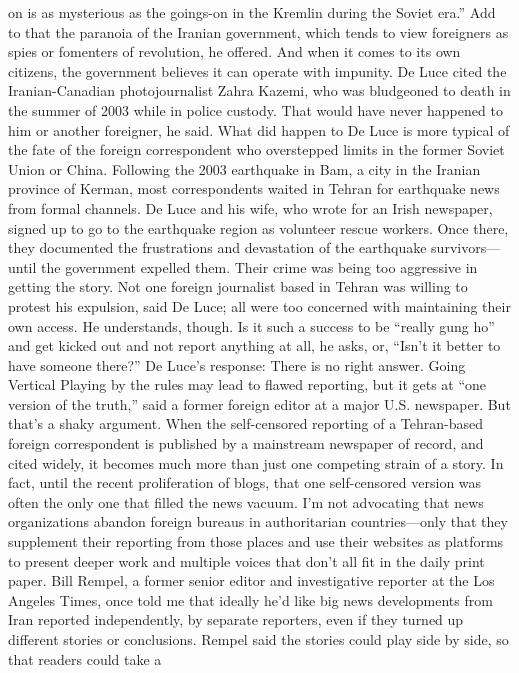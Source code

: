 on is as mysterious as the goings-on in the Kremlin during the Soviet era.'' Add to that
the paranoia of the Iranian government, which tends to view foreigners as spies or
fomenters of revolution, he offered. And when it comes to its own citizens, the
government believes it can operate with impunity. De Luce cited the Iranian-Canadian
photojournalist Zahra Kazemi, who was bludgeoned to death in the summer of 2003
while in police custody. That would have never happened to him or another foreigner, he
said.
What did happen to De Luce is more typical of the fate of the foreign correspondent who
overstepped limits in the former Soviet Union or China. Following the 2003 earthquake
in Bam, a city in the Iranian province of Kerman, most correspondents waited in Tehran
for earthquake news from formal channels. De Luce and his wife, who wrote for an Irish
newspaper, signed up to go to the earthquake region as volunteer rescue workers. Once
there, they documented the frustrations and devastation of the earthquake survivors—
until the government expelled them. Their crime was being too aggressive in getting the
story.
Not one foreign journalist based in Tehran was willing to protest his expulsion, said De
Luce; all were too concerned with maintaining their own access. He understands, though.
Is it such a success to be ``really gung ho'' and get kicked out and not report anything at
all, he asks, or, ``Isn’t it better to have someone there?'' De Luce’s response: There is no
right answer.
Going Vertical
Playing by the rules may lead to flawed reporting, but it gets at ``one version of the truth,''
said a former foreign editor at a major U.S. newspaper. But that’s a shaky argument.
When the self-censored reporting of a Tehran-based foreign correspondent is published
by a mainstream newspaper of record, and cited widely, it becomes much more than just
one competing strain of a story. In fact, until the recent proliferation of blogs, that one
self-censored version was often the only one that filled the news vacuum.
I’m not advocating that news organizations abandon foreign bureaus in authoritarian
countries—only that they supplement their reporting from those places and use their
websites as platforms to present deeper work and multiple voices that don’t all fit in the
daily print paper.
Bill Rempel, a former senior editor and investigative reporter at the Los Angeles Times,
once told me that ideally he’d like big news developments from Iran reported
independently, by separate reporters, even if they turned up different stories or
conclusions. Rempel said the stories could play side by side, so that readers could take a
